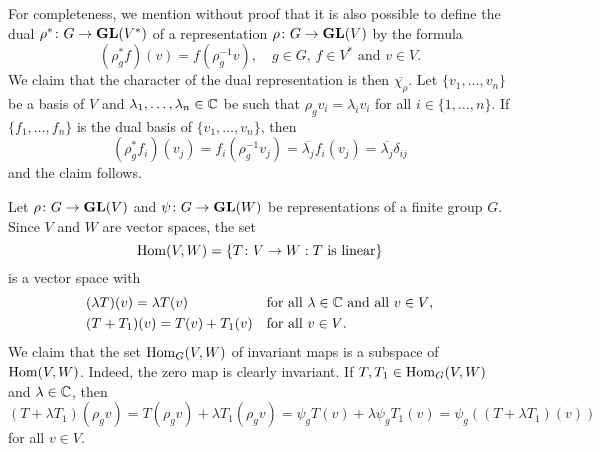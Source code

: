 For completeness, we mention without proof that
it is also possible to define the dual $\rho^*\colon G\to\mathbf{GL}(V^*)$  
of a representation
$\rho\colon G\to\mathbf{GL}(V)$ by the formula
\[
(\rho^*_gf)(v)=f(\rho^{-1}_gv),\quad
g\in G,\,f\in V^*\text{ and }v\in V.
\]  
We claim that the character of the dual representation is then 
$\overline{\chi_\rho}$. Let $\{v_1,\dots,v_n\}$ be a basis of $V$
and $\lambda_1,\dots,\lambda_n\in\mathbb{C}$ be such that $\rho_gv_i=\lambda_iv_i$ for all $i\in\{1,\dots,n\}$. If $\{f_1,\dots,f_n\}$ is the dual basis of $\{v_1,\dots,v_n\}$, then 
\[
(\rho^*_gf_i)(v_j)=f_i(\rho_g^{-1}v_j)
=\overline{\lambda_j}f_i(v_j)
=\overline{\lambda_j}\delta_{ij}
\]
and the claim follows. 
%	
%
%	
%	  
%	


Let $\rho\colon G\to\mathbf{GL}(V)$ and $\psi\colon G\to\mathbf{GL}(W)$ be representations of a finite group
$G$. Since $V$ and $W$ are vector spaces, the set 
\[
\operatorname{Hom}(V,W)=\{T\colon V\to W:\text{$T$ is linear}\}
\]
is a vector space with 
\begin{align*}
&(\lambda T)(v)=\lambda T(v) && \text{for all $\lambda\in\mathbb{C}$ and all $v\in V$,}\\ 
&(T+T_1)(v)=T(v)+T_1(v) &&\text{for all $v\in V$.}
\end{align*}
We claim that the set $\operatorname{Hom}_G(V,W)$ of invariant maps
is a subspace of $\operatorname{Hom}(V,W)$. Indeed, the zero map is clearly invariant. If $T,T_1\in\operatorname{Hom}_G(V,W)$ 
and $\lambda\in\mathbb{C}$, then
\[
(T+\lambda T_1)(\rho_g v)
=T(\rho_gv)+\lambda T_1(\rho_gv)
=\psi_gT(v)+\lambda \psi_gT_1(v)
=\psi_g((T+\lambda T_1)(v))
\]
for all $v\in V$. 
 
